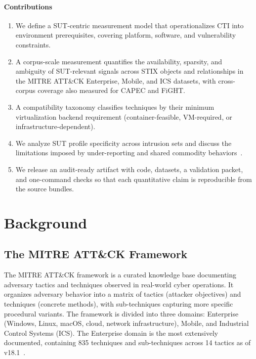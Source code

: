 \documentclass[sigconf,anonymous,review]{acmart}
\newcommand{\stix}{STIX\xspace}
\newcommand{\mitre}{MITRE\xspace}
\newcommand{\attack}{ATT\&CK\xspace}
\begin{document}
\paragraph{Contributions}

\begin{enumerate}
\item We define a SUT-centric measurement model that operationalizes CTI into environment prerequisites, covering platform, software, and vulnerability constraints.
\item A corpus-scale measurement quantifies the availability, sparsity, and ambiguity of SUT-relevant signals across \stix{} objects and relationships in the \mitre{} \attack{} Enterprise, Mobile, and ICS datasets, with cross-corpus coverage also measured for CAPEC and FiGHT\@.
\item A compatibility taxonomy classifies techniques by their minimum virtualization backend requirement (container-feasible, VM-required, or infrastructure-dependent).
\item We analyze SUT profile specificity across intrusion sets and discuss the limitations imposed by under-reporting and shared commodity behaviors~\cite{DBLP:conf/uss/SahaMBCVL25}.
\item We release an audit-ready artifact with code, datasets, a validation packet, and one-command checks so that each quantitative claim is reproducible from the source bundles.
\end{enumerate}


\section{Background}\label{sec:background}

\subsection{The MITRE ATT\&CK Framework}

The \mitre{} \attack{} framework is a curated knowledge base documenting adversary tactics and techniques observed in real-world cyber operations. It organizes adversary behavior into a matrix of tactics (attacker objectives) and techniques (concrete methods), with sub-techniques capturing more specific procedural variants. The framework is divided into three domains: Enterprise (Windows, Linux, macOS, cloud, network infrastructure), Mobile, and Industrial Control Systems (ICS). The Enterprise domain is the most extensively documented, containing 835 techniques and sub-techniques across 14 tactics as of v18.1~\cite{strom2018mitre,DBLP:conf/uss/VirkudIR00024}.
\end{document}
